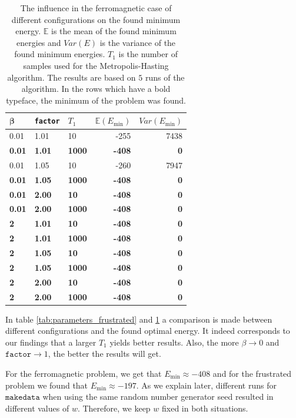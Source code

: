 \documentclass[10pt,a4paper]{article}
\begin{document}
\begin{table}[h]
\centering
\begin{tabular}{|lll|rr|}
\hline
$\mathbf{\beta}$ & \texttt{factor} & $T_1$ & $\mathbb{E}(E_{\min})$ & $Var(E_{\min})$\\
\hline
0.01 & 1.01 & 10 & -255 & 7438\\
\textbf{0.01} & \textbf{1.01} & \textbf{1000} & \textbf{-408} & \textbf{0}\\
0.01 & 1.05 & 10 & -260 & 7947\\
\textbf{0.01} & \textbf{1.05} & \textbf{1000} & \textbf{-408} & \textbf{0}\\
\textbf{0.01} & \textbf{2.00} & \textbf{10} & \textbf{-408} & \textbf{0}\\
\textbf{0.01} & \textbf{2.00} & \textbf{1000} & \textbf{-408} & \textbf{0}\\
\textbf{2} & \textbf{1.01} & \textbf{10} & \textbf{-408} & \textbf{0}\\
\textbf{2} & \textbf{1.01} & \textbf{1000} & \textbf{-408} & \textbf{0}\\
\textbf{2} & \textbf{1.05} & \textbf{10} & \textbf{-408} & \textbf{0}\\
\textbf{2} & \textbf{1.05} & \textbf{1000} & \textbf{-408} & \textbf{0}\\
\textbf{2} & \textbf{2.00} & \textbf{10} & \textbf{-408} & \textbf{0}\\
\textbf{2} & \textbf{2.00} & \textbf{1000} & \textbf{-408} & \textbf{0}\\
\hline
\end{tabular}
\caption{The influence in the ferromagnetic case of different configurations on the found minimum energy. $\mathbb{E}$ is the mean of the found minimum energies and $Var(E)$ is the variance of the found minimum energies. $T_1$ is the number of samples used for the Metropolis-Hasting algorithm. The results are based on $5$ runs of the algorithm. In the rows which have a bold typeface, the minimum of the problem was found.}
\label{tab:parameters_ferromagnetic}
\end{table}

In table \ref{tab:parameters_frustrated} and \ref{tab:parameters_ferromagnetic} a comparison is made between different configurations and the found optimal energy. It indeed corresponds to our findings that a larger $T_1$ yields better results. Also, the more $\beta \rightarrow 0$ and $\texttt{factor} \rightarrow 1$, the better the results will get.

For the ferromagnetic problem, we get that $E_{\min} \approx -408$ and for the frustrated problem we found that $E_{\min} \approx -197$. As we explain later, different runs for $\texttt{makedata}$ when using the same random number generator seed resulted in different values of $w$. Therefore, we keep $w$ fixed in both situations.
\end{document}
